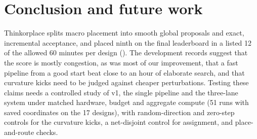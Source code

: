 \section{Conclusion and future work}\label{sec:conclusion}

Thinkorplace splits macro placement into smooth global proposals and exact,
incremental acceptance, and placed ninth on the final leaderboard in a listed 12 of
the allowed 60 minutes per design (\official). The development records suggest that
the score is mostly congestion, as was most of our improvement, that a fast pipeline
from a good start beat close to an hour of elaborate search, and that curvature kicks
need to be judged against cheaper perturbations. Testing these claims needs a
controlled study of v1, the single pipeline and the three-lane system under matched
hardware, budget and aggregate compute (51 runs with saved coordinates on the 17
designs), with random-direction and zero-step controls for the curvature kicks, a
net-disjoint control for assignment, and place-and-route checks.
